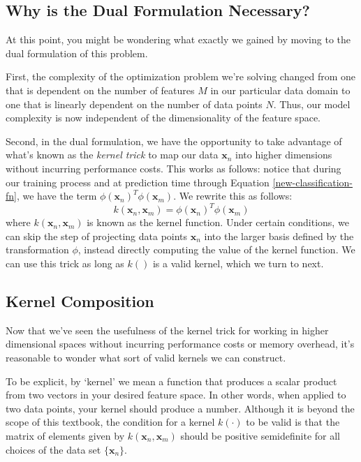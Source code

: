 \subsection{Why is the Dual Formulation Necessary?}
At this point, you might be wondering what exactly we gained by moving to the dual formulation of this problem.

First, the complexity of the optimization problem we're solving changed from one that is dependent on the number of features $M$ in our particular data domain to one that is linearly dependent on the number of data points $N$. Thus, our model complexity is now independent of the dimensionality of the feature space.

Second, in the dual formulation, we have the opportunity to take advantage of what's known as the \textit{kernel trick} to map our data $\textbf{x}_{n}$ into higher dimensions without incurring performance costs. This works as follows: notice that during our training process and at prediction time through Equation \ref{new-classification-fn}, we have the term $\phi(\textbf{x}_{n})^{T} \phi(\textbf{x}_{m})$. We rewrite this as follows:
\begin{equation} \label{kernel-fn}
	k(\textbf{x}_{n}, \textbf{x}_{m}) = \phi(\textbf{x}_{n})^{T} \phi(\textbf{x}_{m})
\end{equation}
where $k(\textbf{x}_{n}, \textbf{x}_{m})$ is known as the kernel function. Under certain conditions, we can skip the step of projecting data points $\textbf{x}_{n}$ into the larger basis defined by the transformation $\phi$, instead directly computing the value of the kernel function. We can use this trick as long as $k()$ is a valid kernel, which we turn to next.


\subsection{Kernel Composition}
Now that we've seen the usefulness of the kernel trick for working in higher dimensional spaces without incurring performance costs or memory overhead, it's reasonable to wonder what sort of valid kernels we can construct.

To be explicit, by `kernel' we mean a function that produces a scalar product from two vectors in your desired feature space. In other words, when applied to two data points, your kernel should produce a number. Although it is beyond the scope of this textbook, the condition for a kernel $k(\cdot)$ to be valid is that the matrix of elements given by $k(\textbf{x}_{n}, \textbf{x}_{m})$ should be positive semidefinite for all choices of the data set $\{ \textbf{x}_{n} \}$.

